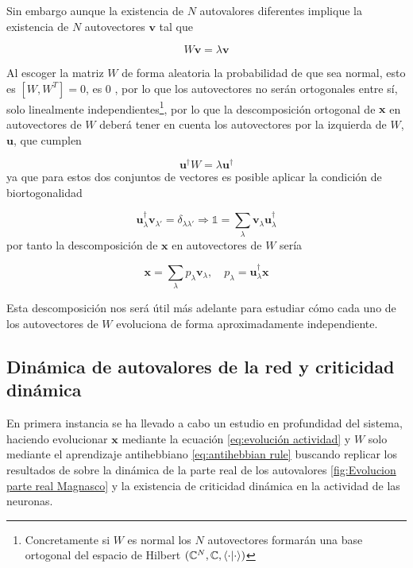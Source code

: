 \documentclass[11pt,a4paper,twoside,pdf]{article}
\numberwithin{equation}{section}
\begin{document}
Sin embargo aunque la existencia de \(N\) autovalores diferentes implique la existencia de \(N\) autovectores \(\mathbf{v}\) tal que

\begin{equation}
  W\mathbf{v} = \lambda \mathbf{v}
\end{equation}

Al escoger la matriz \(W\) de forma aleatoria la probabilidad de que sea normal, esto es \([W,W^T]=0\), es 0 \parencite{mehta1991}, por lo que los autovectores no serán ortogonales entre sí, solo linealmente independientes\footnote{Concretamente si \(W\) es normal los \(N\) autovectores formarán una base ortogonal del espacio de Hilbert \((\mathbb{C}^N, \mathbb{C}, \braket{\cdot}{\cdot})\)}, por lo que la descomposición ortogonal de \(\mathbf{x}\) en autovectores de \(W\) deberá tener en cuenta los autovectores por la izquierda de \(W\), \(\mathbf{u}\), que cumplen

\begin{equation}
  \mathbf{u}^\dagger W = \lambda \mathbf{u}^\dagger
\end{equation}
ya que para estos dos conjuntos de vectores es posible aplicar la condición de biortogonalidad

\begin{equation}
  \mathbf{u}_\lambda^\dagger \mathbf{v}_{\lambda'} = \delta_{\lambda \lambda'} \Rightarrow \mathbb{1} = \sum_{\lambda} \mathbf{v}_\lambda \mathbf{u}_\lambda^\dagger
\end{equation}
por tanto la descomposición de \(\mathbf{x}\) en autovectores de \(W\) sería

\begin{equation}
  \mathbf{x} = \sum_\lambda p_\lambda \mathbf{v}_\lambda, \quad p_\lambda = \mathbf{u}_\lambda^\dagger \mathbf{x}
\end{equation}

Esta descomposición nos será útil más adelante para estudiar cómo cada uno de los autovectores de \(W\) evoluciona de forma aproximadamente independiente.

\subsection{Dinámica de autovalores de la red y criticidad dinámica}
En primera instancia se ha llevado a cabo un estudio en profundidad del sistema, haciendo evolucionar \(\mathbf{x}\) mediante la ecuación \eqref{eq:evolución actividad} y \(W\) solo mediante el aprendizaje antihebbiano \eqref{eq:antihebbian rule} buscando replicar los resultados de \textcite{magnasco2009} sobre la dinámica de la parte real de los autovalores \ref{fig:Evolucion parte real Magnasco} y la existencia de criticidad dinámica en la actividad de las neuronas.
\end{document}
